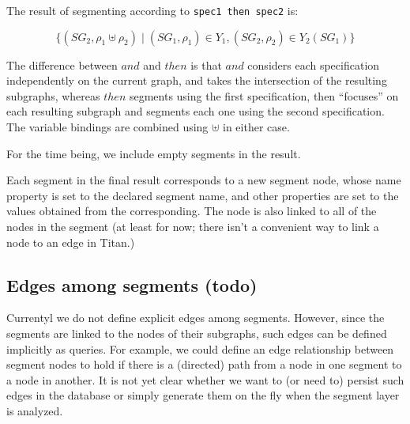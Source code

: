 \documentclass{article}
\begin{document}
  The result of segmenting according to \verb|spec1 then spec2| is:

\[\{(SG_2, \rho_1 \uplus \rho_2)  \mid (SG_1,\rho_1) \in
Y_1, (SG_2,\rho_2) \in Y_2(SG_1)\}\]

The difference between $and$ and $then$ is that $and$ considers each
specification independently on the
current graph, and takes the intersection of the resulting subgraphs, whereas $then$ segments using the first specification,
then ``focuses'' on each resulting subgraph and segments each one
using the second specification.  The variable bindings are combined
using $\uplus$ in either case.

For the time being, we include empty segments in the result.

Each segment in the final result corresponds to a new segment node,
whose name property is set to the declared segment name, and other
properties are set to the values obtained from the corresponding.  The
node is also linked to all of the nodes in the segment (at least for
now; there isn't a convenient way to link a node to an edge in Titan.)

\subsection{Edges among segments (todo)}

Currentyl we do not define explicit edges among segments.  However,
since the segments are linked to the nodes of their subgraphs, such
edges can be defined implicitly as queries.  For example, we could
define an edge relationship between segment nodes to hold if there is
a (directed) path from a node in one segment to a node in another.
It is not yet clear whether we want to (or need to) persist such edges
in the database or simply generate them on the fly when the segment
layer is analyzed.



\end{document}
